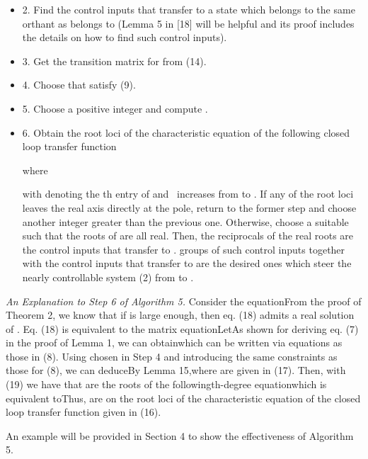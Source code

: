 \documentclass[journal,a4paper,12pt,onecolumn]{IEEEtran}
\begin{document}
\begin{itemize}
\item 2. Find the control inputs that transfer  to a state 
which belongs to the same orthant as  belongs to (Lemma 5 in [18]
will be helpful and its proof includes the details on how to find such
control inputs).

\item 3. Get the transition matrix  for  from (14).

\item 4. Choose  that satisfy (9).

\item 5. Choose a positive integer  and compute .

\item 6. Obtain the root loci of the characteristic equation of the
following closed loop transfer function

where

with  denoting
the th entry of  and \ increases from  to . If any of the root loci
leaves the real axis directly at the pole, return to the former step and
choose another integer  greater than the previous one. Otherwise, choose
a suitable  such that the roots of  are all real.
Then, the reciprocals of the real roots are the control inputs that transfer
 to .  groups
of such control inputs together with the control inputs that transfer 
to  are the desired ones which steer the nearly controllable system
(2) from  to .
\end{itemize}



\emph{An Explanation to Step 6 of Algorithm 5.} Consider the equationFrom the proof of Theorem 2, we know that if  is large enough, then eq.
(18) admits a real solution of . Eq.
(18) is equivalent to the matrix equationLetAs shown for deriving eq. (7) in the proof of Lemma 1, we can obtainwhich can be written via equations as those in (8). Using  chosen in Step 4 and introducing the same constraints
as those for (8), we can deduceBy Lemma 15,where  are given in (17). Then, with (19) we
have that  are the roots of the followingth-degree
equationwhich is equivalent toThus,  are on the root loci of the characteristic equation of the closed
loop transfer function given in (16).



An example will be provided in Section 4 to show the effectiveness of
Algorithm 5.
\end{document}
